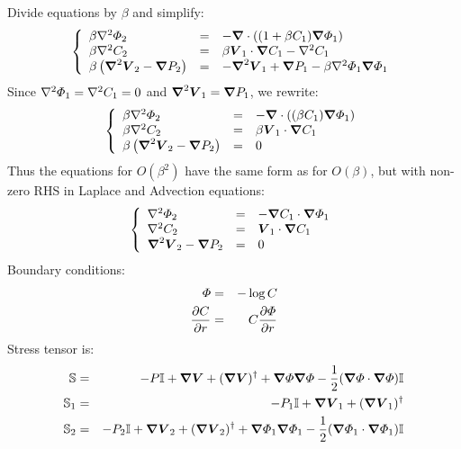 Divide equations by $\beta$ and simplify:
\begin{eqnarray}
 \brc{lll}{
  \beta \Laplacian \varPhi_2 &=& - \bnabla \cdot \brcs{(1 + \beta C_1) \bnabla \varPhi_1}
  \\
  \beta \Laplacian C_2 &=& \beta \bV_1 \cdot \bnabla C_1 -\Laplacian C_1
  \\
  \beta\brcs{\bLaplacian \bV_2 - \bnabla P_2} &=& - \bLaplacian \bV_1 + \bnabla P_1 - \beta \Laplacian \varPhi_1 \bnabla \varPhi_1}
\end{eqnarray}
Since $\Laplacian\varPhi_1 = \Laplacian C_1 = 0$ and $\bLaplacian \bV_1 = \bnabla P_1$, we rewrite:
\begin{eqnarray}
 \brc{lll}{
  \beta \Laplacian \varPhi_2 &=& - \bnabla \cdot \brcs{(\beta C_1) \bnabla \varPhi_1}
  \\
  \beta \Laplacian C_2 &=& \beta \bV_1 \cdot \bnabla C_1
  \\
  \beta\brcs{\bLaplacian \bV_2 - \bnabla P_2} &=& 0
 }
\end{eqnarray}
Thus the equations for $O(\beta^2)$ have the same form as for $O(\beta)$, but with non-zero RHS in Laplace and Advection equations:
\begin{eqnarray}
 \brc{lll}{
  \Laplacian \varPhi_2 &=& -\bnabla C_1 \cdot \bnabla \varPhi_1
  \\
  \Laplacian C_2 &=& \bV_1 \cdot \bnabla C_1
  \\
  \bLaplacian \bV_2 - \bnabla P_2 &=& 0
 }
\end{eqnarray}
Boundary conditions:
\begin{eqnarray}
  \varPhi &=& -\log C \\
  \deriv{C}{r} &=& C\deriv{\varPhi}{r}
\end{eqnarray}
Stress tensor is:
\begin{eqnarray}
  \mathbb{S} &=& -P \mathbb{I} + \bnabla \bV + (\bnabla \bV)^\dagger +
  \bnabla \varPhi \bnabla \varPhi - \frac{1}{2} (\bnabla \varPhi \cdot \bnabla \varPhi) \mathbb{I}
  \\
  \mathbb{S}_1 &=& -P_1 \mathbb{I} + \bnabla \bV_1 + (\bnabla \bV_1)^\dagger
  \\
  \mathbb{S}_2 &=& -P_2 \mathbb{I} + \bnabla \bV_2 + (\bnabla \bV_2)^\dagger + \bnabla \varPhi_1 \bnabla \varPhi_1 - \frac{1}{2} (\bnabla \varPhi_1 \cdot \bnabla \varPhi_1) \mathbb{I}
\end{eqnarray} 